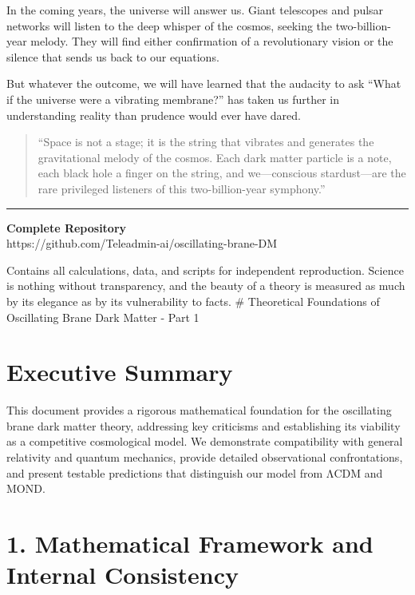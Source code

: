 \documentclass[
  11pt,
]{report}
\begin{document}
In the coming years, the universe will answer us. Giant telescopes and
pulsar networks will listen to the deep whisper of the cosmos, seeking
the two-billion-year melody. They will find either confirmation of a
revolutionary vision or the silence that sends us back to our equations.

But whatever the outcome, we will have learned that the audacity to ask
``What if the universe were a vibrating membrane?'' has taken us further
in understanding reality than prudence would ever have dared.

\begin{quote}
``Space is not a stage; it is the string that vibrates and generates the
gravitational melody of the cosmos. Each dark matter particle is a note,
each black hole a finger on the string, and we---conscious
stardust---are the rare privileged listeners of this two-billion-year
symphony.''
\end{quote}

\begin{center}\rule{0.5\linewidth}{0.5pt}\end{center}

\textbf{Complete Repository}\\
https://github.com/Teleadmin-ai/oscillating-brane-DM

Contains all calculations, data, and scripts for independent
reproduction. Science is nothing without transparency, and the beauty of
a theory is measured as much by its elegance as by its vulnerability to
facts. \newpage \# Theoretical Foundations of Oscillating Brane Dark
Matter - Part 1

\section{Executive Summary}\label{executive-summary-1}

This document provides a rigorous mathematical foundation for the
oscillating brane dark matter theory, addressing key criticisms and
establishing its viability as a competitive cosmological model. We
demonstrate compatibility with general relativity and quantum mechanics,
provide detailed observational confrontations, and present testable
predictions that distinguish our model from ΛCDM and MOND.

\section{1. Mathematical Framework and Internal
Consistency}\label{mathematical-framework-and-internal-consistency}
\end{document}

